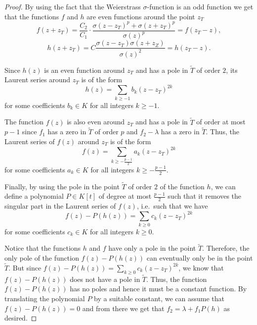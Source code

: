 \documentclass[a4paper, 12pt]{amsart}
\theoremstyle{definition}
\theoremstyle{remark}
\numberwithin{equation}{section}
\begin{document}
\begin{proof}
    By using the fact that the Weierstrass $\sigma$-function is an odd function we get that the functions $f$ and $h$ are even functions around the point $z_T$ 
    \[
        f(z+z_T)=\frac{C_2}{C_1}\cdot\frac{\sigma(z-z_T)^p+\sigma(z+z_T)^p}{\sigma(z)^p}=f(z_T-z),
    \]
    \[
        h(z+z_T)=C\frac{\sigma(z-z_T)\sigma(z+z_Z)}{\sigma(z)^2}=h(z_T-z).
    \]
    
    Since $h(z)$ is an even function around $z_T$ and has a pole in $\tilde{T}$ of order $2$, its Laurent series around $z_T$ is of the form 
    \[
        h(z)=\sum_{k \geq -1} b_k(z-z_T)^{2k}
    \]
    for some coefficients $b_k \in K$ for all integers $k\geq -1$.
    
    The function $f(z)$ is also even around $z_T$ and has a pole in $\tilde{T}$ of order at most $p-1$ since $f_1$ has a zero in $\tilde{T}$ of order $p$ and $f_2-\lambda$ has a zero in $\tilde{T}$. Thus, the Laurent series of $f(z)$ around $z_T$ is of the form
    \[
        f(z)=\sum_{k \geq -\frac{p-1}{2}} a_k(z-z_T)^{2k}
    \]
    for some coefficients $a_k \in K$ for all integers $k\geq -\frac{p-1}{2}$.
    
    Finally, by using the pole in the point $\tilde{T}$ of order $2$ of the function $h$, we can define a polynomial $P\in K[t]$ of degree at most $\frac{p-1}{2}$ such that it removes the singular part in the Laurent series of $f(z)$, i.e.\ such that we have
    \[
        f(z)-P(h(z))=\sum_{k\geq 0} c_k(z-z_T)^{2k}
    \]
    for some coefficients $c_k \in K$ for all integers $k\geq 0$.

    Notice that the functions $h$ and $f$ have only a pole in the point $\tilde{T}$. Therefore, the only pole of the function $f(z)-P(h(z))$ can eventually only be in the point $\tilde{T}$. But since $f(z)-P(h(z))=\displaystyle{\sum_{k\geq 0} c_k(z-z_T)^{2k}}$, we know that $f(z)-P(h(z))$ does not have a pole in $\tilde{T}$. Thus, the function $f(z)-P(h(z))$ has no poles and hence it must be a constant function. By translating the polynomial $P$ by a suitable constant, we can assume that ${f(z)-P(h(z))=0}$ and from there we get that $f_2=\lambda+f_1 P(h)$ as desired.
\end{proof}
\end{document}
